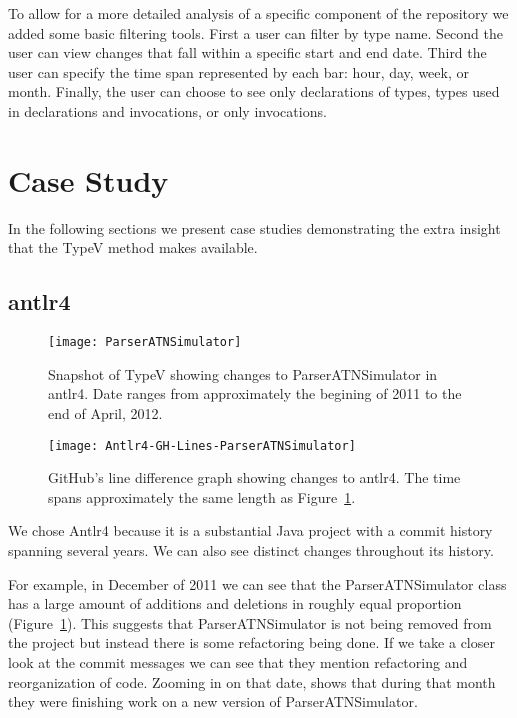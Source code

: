 To allow for a more detailed analysis of a specific component of the repository we added some basic filtering tools. First a user can filter by type name. Second the user can view changes that fall within a specific start and end date. Third the user can specify the time span represented by each bar: hour, day, week, or month. Finally, the user can choose to see only declarations of types, types used in declarations and invocations, or only invocations.

\section{Case Study}

In the following sections we present case studies demonstrating the extra insight that the TypeV method makes available.

\subsection{antlr4}

\begin{figure}[!ht]
\centering
\texttt{[image: ParserATNSimulator]}
\caption{Snapshot of TypeV showing changes to ParserATNSimulator in antlr4. Date ranges from approximately the begining of 2011 to the end of April, 2012.}
\label{fig:parser1}
\end{figure}

\begin{figure}[!ht]
\centering
\texttt{[image: Antlr4-GH-Lines-ParserATNSimulator]}
\caption{GitHub's line difference graph showing changes to antlr4. The time spans approximately the same length as Figure~\ref{fig:parser1}.}
\label{fig:parser2}
\end{figure}

We chose Antlr4 because it is a substantial Java project with a commit history spanning several years. We can also see distinct changes throughout its history.

For example, in December of 2011 we can see that the ParserATNSimulator class has a large amount of additions and deletions in roughly equal proportion (Figure~\ref{fig:parser1}). This suggests that ParserATNSimulator is not being removed from the project but instead there is some refactoring being done. If we take a closer look at the commit messages we can see that they mention refactoring and reorganization of code. Zooming in on that date,  shows that during that month they were finishing work on a new version of ParserATNSimulator.

